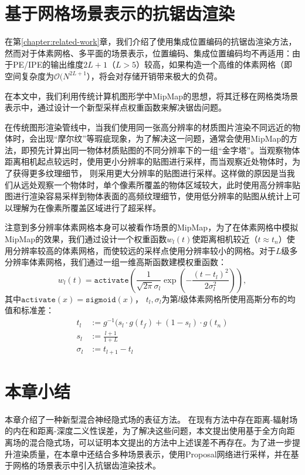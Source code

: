 \section{基于网格场景表示的抗锯齿渲染}
\label{sec: omninerf-anti-aliasing}
在第\ref{chapter:related-work}章，我们介绍了使用集成位置编码的抗锯齿渲染方法\cite{barron_mip-nerf_2021, barron_mip-nerf_2022}，然而对于体素网格、多平面的场景表示，位置编码、集成位置编码均不再适用：由于PE/IPE的输出维度$2L+1$（$L>5$）较高，如果构造一个高维的体素网格（即空间复杂度为$\mathcal{O}(N^{2L+1}$），将会对存储开销带来极大的负荷。

在本文中，我们利用传统计算机图形学中MipMap\cite{williams_pyramidal_1983}的思想，将其迁移在网格类场景表示中，通过设计一个新型采样点权重函数来解决锯齿问题。

在传统图形渲染管线中，当我们使用同一张高分辨率的材质图片渲染不同远近的物体时，会出现“摩尔纹”等瑕疵现象，为了解决这一问题，通常会使用MipMap的方法，即预先计算出同一物体材质贴图的不同分辨率下的一组“金字塔”。当观察物体距离相机起点较远时，使用更小分辨率的贴图进行采样，而当观察近处物体时，为了获得更多纹理细节， 则采用更大分辨率的贴图进行采样。这样做的原因是当我们从远处观察一个物体时，单个像素所覆盖的物体区域较大，此时使用高分辨率贴图进行渲染容易采样到物体表面的高频纹理细节，使用低分辨率的贴图从统计上可以理解为在像素所覆盖区域进行了超采样。

注意到多分辨率体素网格本身可以被看作场景的MipMap，为了在体素网格中模拟MipMap的效果，我们通过设计一个权重函数$w_l(t)$使距离相机较近（$t\approx t_n$）使用分辨率较高的体素网格，而使较远的采样点使用分辨率较小的网格。对于$L$级多分辨率体素网格，我们通过一组一维高斯函数建模权重函数：
\begin{equation}
    w_l(t) = \mathtt{activate}(\frac{1}{\sqrt{2\pi}\sigma_l}\exp(-\frac{(t-t_l)^2}{2\sigma_l^2})),
\end{equation}
其中$\mathtt{activate}(x) = \mathtt{sigmoid}(x)$， $t_l, \sigma_l$为第$l$级体素网格所使用高斯分布的均值和标准差：
\begin{align}
    t_l &:= g^{-1}(s_l\cdot g(t_f) + (1-s_l)\cdot g(t_n)\\
    s_l &:= \frac{l + 1}{1 + L}\\
    \sigma_l &:= t_{l+1} - t_{l}
\end{align}


\section{本章小结}
本章介绍了一种新型混合神经隐式场的表征方法。 在现有方法中存在距离-辐射场的内在和距离-深度二义性误差，为了解决这些问题，本文提出使用基于全方向距离场的混合隐式场，可以证明本文提出的方法中上述误差不再存在。为了进一步提升渲染质量，在本章中还结合多种场景表示，使用Proposal网络进行采样，并在基于网格的场景表示中引入抗锯齿渲染技术。